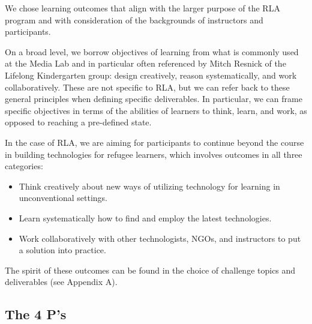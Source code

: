 \documentclass[12pt,twoside,vi]{mitthesis}
\begin{document}
We chose learning outcomes that align with the larger purpose of the RLA program and with consideration of the backgrounds of instructors and participants. 

On a broad level, we borrow objectives of learning from what is commonly used at the Media Lab and in particular often referenced by Mitch Resnick of the Lifelong Kindergarten group: design creatively, reason systematically, and work collaboratively.
These are not specific to RLA, but we can refer back to these general principles when defining specific deliverables. In particular, we can frame specific objectives in terms of the abilities of learners to think, learn, and work, as opposed to reaching a pre-defined state.~\cite{roleofmaking}

In the case of RLA, we are aiming for participants to continue beyond the course in building technologies for refugee learners, which involves outcomes in all three categories:
\begin{itemize}
\item Think creatively about new ways of utilizing technology for learning in unconventional settings.
\item Learn systematically how to find and employ the latest technologies.
\item Work collaboratively with other technologists, NGOs, and instructors to put a solution into practice.
\end{itemize}
The spirit of these outcomes can be found in the choice of challenge topics and deliverables (see Appendix A).

\subsection{The 4 P's}
\end{document}
